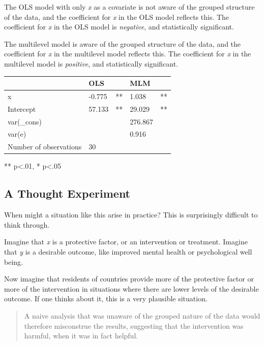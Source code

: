 \documentclass[
  letterpaper,
  DIV=11,
  numbers=noendperiod]{scrreprt}
\begin{document}
The OLS model with only \emph{x} as a covariate is not aware of the
grouped structure of the data, and the coefficient for \emph{x} in the
OLS model reflects this. The coefficient for \emph{x} in the OLS model
is \emph{negative}, and statistically significant.

The multilevel model is aware of the grouped structure of the data, and
the coefficient for \emph{x} in the multilevel model reflects this. The
coefficient for \emph{x} in the multilevel model is \emph{positive}, and
statistically significant.

\begin{longtable}[]{@{}lllll@{}}
\toprule\noalign{}
& OLS & & MLM & \\
\midrule\noalign{}
\endhead
\bottomrule\noalign{}
\endlastfoot
x & -0.775 & ** & 1.038 & ** \\
Intercept & 57.133 & ** & 29.029 & ** \\
var(\_cons) & & & 276.867 & \\
var(e) & & & 0.916 & \\
Number of observations & 30 & & & \\
\end{longtable}

** p\textless.01, * p\textless.05

\hypertarget{a-thought-experiment}{%
\subsection{A Thought Experiment}\label{a-thought-experiment}}

When might a situation like this arise in practice? This is surprisingly
difficult to think through.

Imagine that \emph{x} is a protective factor, or an intervention or
treatment. Imagine that \emph{y} is a desirable outcome, like improved
mental health or psychological well being.

Now imagine that residents of countries provide more of the protective
factor or more of the intervention in situations where there are lower
levels of the desirable outcome. If one thinks about it, this is a very
plausible situation.

\begin{quote}
A naive analysis that was unaware of the grouped nature of the data
would therefore misconstrue the results, suggesting that the
intervention was harmful, when it was in fact helpful.
\end{quote}
\end{document}
